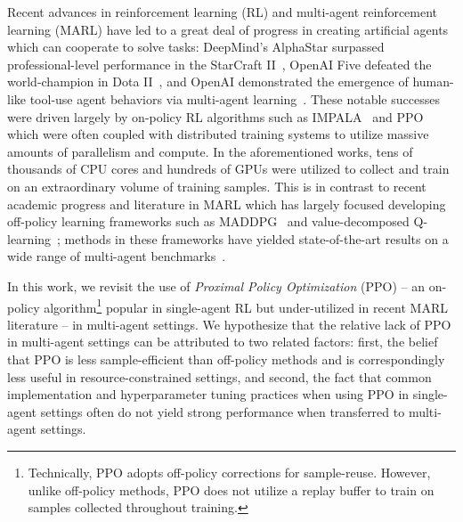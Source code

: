 \documentclass{article}
\theoremstyle{plain}
\theoremstyle{definition}
\theoremstyle{remark}
\begin{document}
Recent advances in reinforcement learning (RL) and multi-agent reinforcement learning (MARL) have led to a great deal of progress in creating artificial agents which can cooperate to solve tasks: DeepMind's AlphaStar surpassed professional-level performance in the StarCraft II~\cite{vinyals2019grandmaster}, OpenAI Five defeated the world-champion in Dota II~\cite{DBLP:journals/corr/abs-1912-06680}, and OpenAI demonstrated the emergence of human-like tool-use agent behaviors via multi-agent learning~\cite{baker2020emergent}. These notable successes were driven largely by on-policy RL algorithms such as IMPALA~\cite{espeholt2018impala} and PPO~\cite{PPO,DBLP:journals/corr/abs-1912-06680} which were often coupled with distributed training systems to utilize massive amounts of parallelism and compute. In the aforementioned works, tens of thousands of CPU cores and hundreds of GPUs were utilized to collect and train on an extraordinary volume of training samples. This is in contrast to recent academic progress and literature in MARL which has largely focused developing off-policy learning frameworks such as MADDPG~\cite{lowe2017multi} and value-decomposed Q-learning~\cite{sunehag2018value, pmlr-v80-rashid18a}; methods in these frameworks have yielded state-of-the-art results on a wide range of multi-agent benchmarks~\cite{wang2021qplex, wang2021rode}. 


In this work, we revisit the use of \emph{Proximal Policy Optimization} (PPO) -- an on-policy algorithm\footnote{Technically, PPO adopts off-policy corrections for sample-reuse. However, unlike off-policy methods, PPO does not utilize a replay buffer to train on samples collected throughout training.} popular in single-agent RL but under-utilized in recent MARL literature -- in multi-agent settings. We hypothesize that the relative lack of PPO in multi-agent settings can be attributed to two related factors: first, the belief that PPO is less sample-efficient than off-policy methods and is correspondingly less useful in resource-constrained settings, and second, the fact that common implementation and hyperparameter tuning practices when using PPO in single-agent settings often do not yield strong performance when transferred to multi-agent settings.
\end{document}
